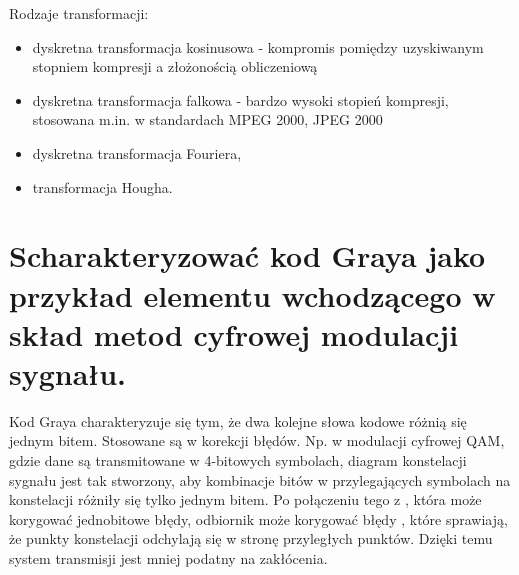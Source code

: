 \documentclass[12pt,a4paper]{article}
\begin{document}
	Rodzaje transformacji:
	\begin{itemize}
		\item dyskretna transformacja kosinusowa - kompromis pomiędzy uzyskiwanym stopniem kompresji a złożonością obliczeniową
		\item dyskretna transformacja falkowa - bardzo wysoki stopień kompresji, stosowana m.in. w standardach MPEG 2000, JPEG 2000
		\item dyskretna transformacja Fouriera,
		\item transformacja Hougha.
	\end{itemize}

	\section{Scharakteryzować kod Graya jako przykład elementu wchodzącego w skład metod cyfrowej modulacji sygnału.}
	Kod Graya charakteryzuje się tym, że dwa kolejne słowa kodowe różnią się jednym bitem. Stosowane są w korekcji błędów. Np. w modulacji cyfrowej QAM, gdzie dane są transmitowane w 4-bitowych symbolach, diagram konstelacji sygnału jest tak stworzony, aby kombinacje bitów w przylegających symbolach na konstelacji różniły się tylko jednym bitem. Po połączeniu tego z , która może korygować jednobitowe błędy, odbiornik może korygować błędy , które sprawiają, że punkty konstelacji odchylają się w stronę przyległych punktów. Dzięki temu system transmisji jest mniej podatny na zakłócenia.
\end{document}

